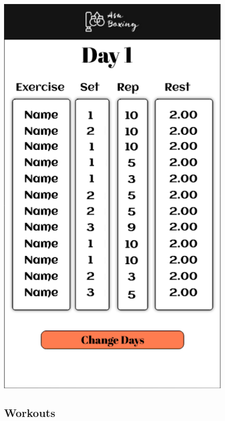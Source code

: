 \documentclass[a4paper,12pt]{report}
\begin{document}
\begin{center}
\includegraphics[scale=0.377]{images/dayWorkouts.png}
\end{center}
\subsection{Workouts}
\end{document}
